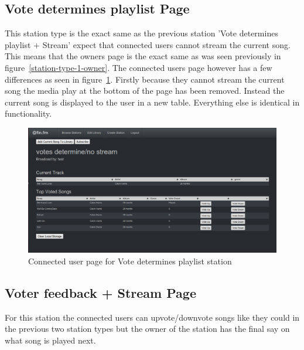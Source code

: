 \documentclass[a4paper, 12pt]{report}
\begin{document}
\subsection{Vote determines playlist Page}
This station type is the exact same as the previous station 'Vote determines playlist + Stream' expect that connected users cannot stream the current song. This means that the owners page is the exact same as was seen previously in figure~\ref{station-type-1-owner}. The connected users page however has a few differences as seen in figure~\ref{station-type-2-listener}. Firstly because they cannot stream the current song the media play at the bottom of the page has been removed. Instead the current song is displayed to the user in a new table. Everything else is identical in functionality.
\begin{figure}[H]
  \centering
    \includegraphics[width=1.0\textwidth]{screenshots/station-type-2-listener.png}
    \caption{Connected user page for Vote determines playlist station}
    \label{station-type-2-listener}
\end{figure}

\subsection{Voter feedback + Stream Page}
For this station the connected users can upvote/downvote songs like they could in the previous two station types but the owner of the station has the final say on what song is played next.\\
\end{document}
